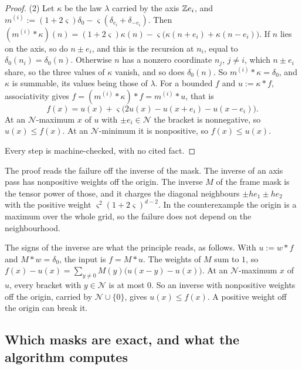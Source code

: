 \begin{proof}
(2) Let $\kappa$ be the law $\lambda$ carried by the axis $\mathbb{Z} e_i$, and
$m^{(i)} := (1 + 2\varsigma)\delta_0 - \varsigma(\delta_{e_i} + \delta_{-e_i})$. Then
$(m^{(i)} * \kappa)(n) = (1 + 2\varsigma)\kappa(n) - \varsigma\bigl(\kappa(n + e_i) +
\kappa(n - e_i)\bigr)$. If $n$ lies on the axis, so do $n \pm e_i$, and this is the recursion at
$n_i$, equal to $\delta_0(n_i) = \delta_0(n)$. Otherwise $n$ has a nonzero coordinate $n_j$,
$j \ne i$, which $n \pm e_i$ share, so the three values of $\kappa$ vanish, and so does
$\delta_0(n)$. So $m^{(i)} * \kappa = \delta_0$, and $\kappa$ is summable, its values being those
of $\lambda$. For a bounded $f$ and $u := \kappa * f$, associativity gives
$f = (m^{(i)} * \kappa) * f = m^{(i)} * u$, that is
\[
f(x) = u(x) + \varsigma\bigl(2u(x) - u(x + e_i) - u(x - e_i)\bigr) .
\]
At an $\mathcal{N}$-maximum $x$ of $u$ with $\pm e_i \in \mathcal{N}$ the bracket is nonnegative,
so $u(x) \le f(x)$. At an $\mathcal{N}$-minimum it is nonpositive, so $f(x) \le u(x)$.

Every step is machine-checked, with no cited fact.
\end{proof}

The proof reads the failure off the inverse of the mask. The inverse of an axis pass has
nonpositive weights off the origin. The inverse $M$ of the frame mask is the tensor power of those,
and it charges the diagonal neighbours $\pm he_1 \pm he_2$ with the positive weight
$\varsigma^2(1 + 2\varsigma)^{d-2}$. In the counterexample the origin is a maximum over the whole
grid, so the failure does not depend on the neighbourhood.

The signs of the inverse are what the principle reads, as follows. With $u := w * f$ and
$M * w = \delta_0$, the input is $f = M * u$. The weights of $M$ sum to $1$, so
$f(x) - u(x) = \sum_{y \ne 0}M(y)\bigl(u(x - y) - u(x)\bigr)$. At an $\mathcal{N}$-maximum $x$ of
$u$, every bracket with $y \in \mathcal{N}$ is at most $0$. So an inverse with nonpositive weights
off the origin, carried by $\mathcal{N} \cup \{0\}$, gives $u(x) \le f(x)$. A positive weight off
the origin can break it.

\subsection{Which masks are exact, and what the algorithm computes}
\label{sec:price-masks}

